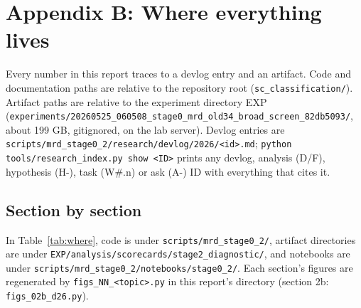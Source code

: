 \section*{Appendix B: Where everything lives}
{}
\label{app:where}

Every number in this report traces to a devlog entry and an artifact. Code and documentation paths are relative to the repository root (\texttt{sc\_classification/}). Artifact paths are relative to the experiment directory EXP (\nolinkurl{experiments/20260525_060508_stage0_mrd_old34_broad_screen_82db5093/}, about 199 GB, gitignored, on the lab server). Devlog entries are \nolinkurl{scripts/mrd_stage0_2/research/devlog/2026/<id>.md}; \texttt{python tools/research\_index.py show <ID>} prints any devlog, analysis (D/F), hypothesis (H-), task (W\#.n) or ask (A-) ID with everything that cites it.

\subsection*{Section by section}

In Table~\ref{tab:where}, code is under \nolinkurl{scripts/mrd_stage0_2/}, artifact directories are under \nolinkurl{EXP/analysis/scorecards/stage2_diagnostic/}, and notebooks are under \nolinkurl{scripts/mrd_stage0_2/notebooks/stage0_2/}. Each section's figures are regenerated by \texttt{figs\_NN\_<topic>.py} in this report's directory (section 2b: \texttt{figs\_02b\_d26.py}).

